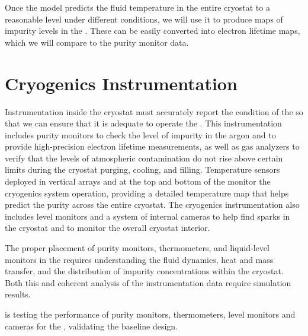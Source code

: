 Once the   model %
predicts the fluid temperature in the entire cryostat to a reasonable level under different conditions, we will use it %
to produce maps of impurity levels in the . These can be easily converted into electron lifetime maps, which we will %
compare to the %
 purity monitor data. 


\section{Cryogenics Instrumentation}
\label{sec:fdgen-cryo-instr}
Instrumentation inside the cryostat must accurately report the condition of the  so that we can ensure that it is adequate to operate the .
This instrumentation includes %
purity monitors %
to check the level of impurity in the argon and %
to provide high-precision electron lifetime measurements,
as well as gas analyzers to verify that the levels of atmospheric contamination do not rise above %
certain limits during the cryostat purging, cooling, and filling. 
Temperature sensors deployed in vertical arrays and at the top and bottom of the  monitor the cryogenics system operation, providing a 
detailed \threed temperature map that helps predict the  purity across the entire cryostat. The cryogenics instrumentation also includes  level monitors and
a system of internal cameras to help find sparks in the cryostat and %
to monitor the overall cryostat interior. 

The proper placement of purity monitors, thermometers, and liquid-level monitors in the  requires %
understanding the  fluid dynamics, heat and mass transfer, and the distribution of impurity concentrations within the cryostat. %
Both this and %
coherent analysis of the instrumentation data require  simulation results.

 is testing the performance of 
purity monitors, thermometers, level monitors and cameras
for the , validating the baseline  %
design.





